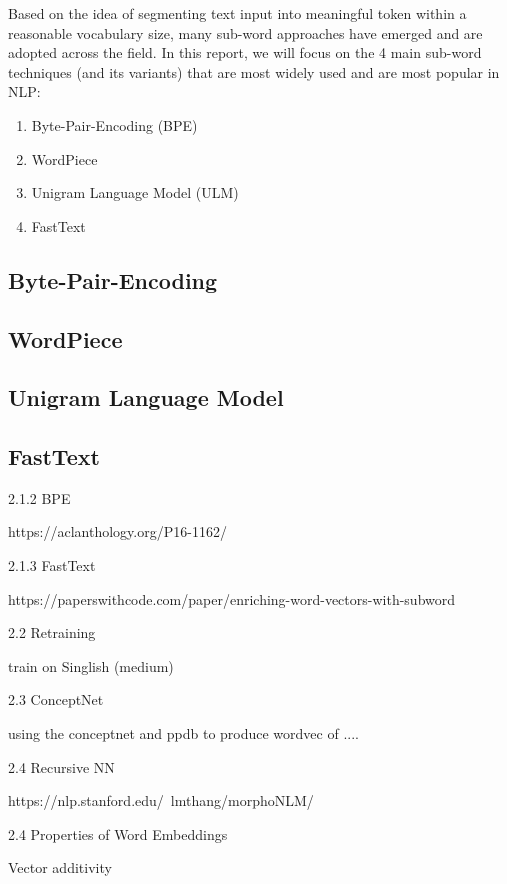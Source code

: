 Based on the idea of segmenting text input into meaningful token within a reasonable vocabulary size, many sub-word approaches have emerged and are adopted across the field. In this report, we will focus on the 4 main sub-word techniques (and its variants) that are most widely used and are most popular in NLP: 

\begin{enumerate}
	\item Byte-Pair-Encoding (BPE)
	\item WordPiece 
	\item Unigram Language Model (ULM)
	\item FastText 
\end{enumerate}

\subsection{Byte-Pair-Encoding} 

\subsection{WordPiece}

\subsection{Unigram Language Model}

\subsection{FastText} 

2.1.2 BPE

https://aclanthology.org/P16-1162/ 

2.1.3 FastText 

https://paperswithcode.com/paper/enriching-word-vectors-with-subword 

2.2 Retraining

train on Singlish (medium) 

2.3 ConceptNet

using the conceptnet and ppdb to produce wordvec of .... 

2.4 Recursive NN 

https://nlp.stanford.edu/~lmthang/morphoNLM/ 



2.4 Properties of Word Embeddings 

Vector additivity 


